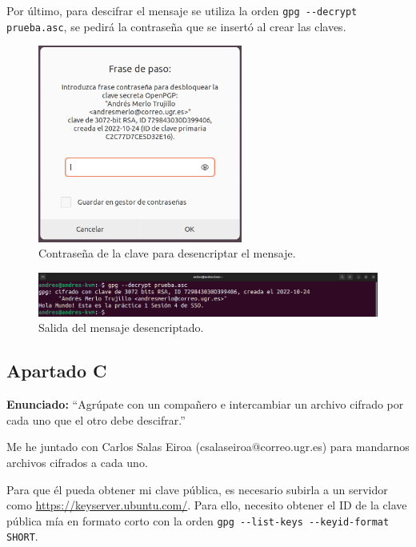 \documentclass{article}
\begin{document}
Por último, para descifrar el mensaje se utiliza la orden \verb|gpg --decrypt prueba.asc|, se pedirá la contraseña que se insertó al crear las claves.

\begin{figure}[H]
    \centering
    \includegraphics[width=0.6\textwidth]{imagenes/Portatil/Captura desde 2022-10-24 12-17-29.png}
    \caption{Contraseña de la clave para desencriptar el mensaje.}
\end{figure}

\begin{figure}[H]
    \includegraphics[width=\textwidth]{imagenes/Portatil/Captura desde 2022-10-27 18-35-01.png}
    \caption{Salida del mensaje desencriptado.}
\end{figure}


{}
\subsection*{Apartado C}

\textbf{Enunciado: }``Agrúpate con un compañero e intercambiar un archivo cifrado por cada uno que el otro debe descifrar.''

\bigskip

Me he juntado con Carlos Salas Eiroa (csalaseiroa@correo.ugr.es) para mandarnos archivos cifrados a cada uno.

Para que él pueda obtener mi clave pública, es necesario subirla a un servidor como \url{https://keyserver.ubuntu.com/}. Para ello, necesito obtener el ID de la clave pública mía en formato corto con la orden \verb|gpg --list-keys --keyid-format SHORT|.
\end{document}
